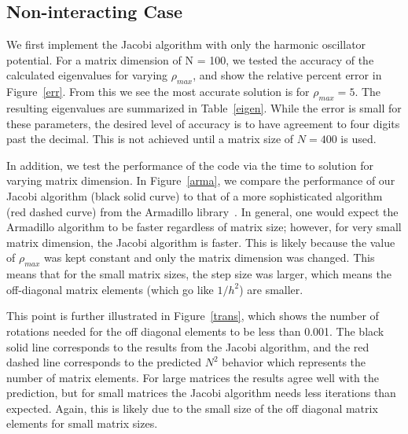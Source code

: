 \documentclass[prc,amsmath,twocolumn,superscriptaddress]{revtex4}
\begin{document}
\subsection{Non-interacting Case}
We first implement the Jacobi algorithm with only the harmonic oscillator potential. %
For a matrix dimension of N = 100, we tested the accuracy of the calculated eigenvalues for varying $\rho_{max}$, and show the relative percent error in Figure~\ref{err}. From this we see the most accurate solution is for $\rho_{max}=5$. The resulting eigenvalues are summarized in Table~\ref{eigen}. While the error is small for these parameters, the desired level of accuracy is to have agreement to four digits past the decimal. This is not achieved until a matrix size of $N=400$ is used.

In addition, we test the performance of the code via the time to solution for varying matrix dimension. In Figure~\ref{arma}, we compare the performance of our Jacobi algorithm (black solid curve) to that of a more sophisticated algorithm (red dashed curve) from the Armadillo library~\cite{armadillo}. In general, one would expect the Armadillo algorithm to be faster regardless of matrix size; however, for very small matrix dimension, the Jacobi algorithm is faster. This is likely because the value of $\rho_{max}$ was kept constant and only the matrix dimension was changed. This means that for the small matrix sizes, the step size was larger, which means the off-diagonal matrix elements (which go like $1/h^2$) are smaller. %

This point is further illustrated in Figure~\ref{trans}, which shows the number of rotations needed for the off diagonal elements to be less than 0.001. The black solid line corresponds to the results from the Jacobi algorithm, and the red dashed line corresponds to the predicted $N^2$ behavior which represents the number of matrix elements. For large matrices the results agree well with the prediction, but for small matrices the Jacobi algorithm needs less iterations than expected. Again, this is likely due to the small size of the off diagonal matrix elements for small matrix sizes.
\end{document}
